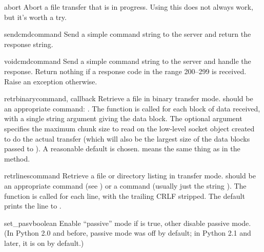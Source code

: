 \begin{methoddesc}[FTP]{abort}{}
Abort a file transfer that is in progress.  Using this does not always
work, but it's worth a try.
\end{methoddesc}

\begin{methoddesc}[FTP]{sendcmd}{command}
Send a simple command string to the server and return the response
string.
\end{methoddesc}

\begin{methoddesc}[FTP]{voidcmd}{command}
Send a simple command string to the server and handle the response.
Return nothing if a response code in the range 200--299 is received.
Raise an exception otherwise.
\end{methoddesc}

\begin{methoddesc}[FTP]{retrbinary}{command,
    callback}
Retrieve a file in binary transfer mode.   should be an
appropriate  command: .
The  function is called for each block of data received,
with a single string argument giving the data block.
The optional  argument specifies the maximum chunk size to
read on the low-level socket object created to do the actual transfer
(which will also be the largest size of the data blocks passed to
).  A reasonable default is chosen.  means the
same thing as in the  method.
\end{methoddesc}

\begin{methoddesc}[FTP]{retrlines}{command}
Retrieve a file or directory listing in \ASCII{} transfer mode.
 should be an appropriate  command (see
) or a  command (usually just the string
).  The  function is called for each line,
with the trailing CRLF stripped.  The default  prints
the line to .
\end{methoddesc}

\begin{methoddesc}[FTP]{set_pasv}{boolean}
Enable ``passive'' mode if  is true, other disable
passive mode.  (In Python 2.0 and before, passive mode was off by
default; in Python 2.1 and later, it is on by default.)
\end{methoddesc}

